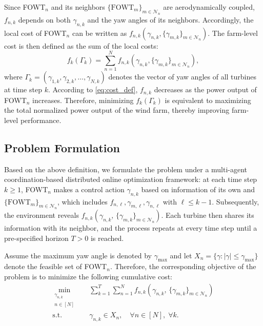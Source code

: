 Since FOWT$_n$ and its neighbors $\{\text{FOWT}_m\}_{m \in \mathcal{N}_n}$ are aerodynamically coupled, $f_{n,k}$ depends on both $\gamma_{n,k}$ and the yaw angles of its neighbors. Accordingly, the local cost of FOWT$_n$ can be written as $f_{n,k}\!\left(\gamma_{n,k}, \{\gamma_{m,k}\}_{m \in \mathcal{N}_n}\right)$. The farm-level cost is then defined as the sum of the local costs:
\begin{equation} \label{eq:cost_sum}
    f_k(\Gamma_k) = \sum_{n=1}^N f_{n,k}\!\left(\gamma_{n,k}, \{\gamma_{m,k}\}_{m \in \mathcal{N}_n}\right),
\end{equation}
where $\Gamma_k = (\gamma_{1,k}, \gamma_{2,k}, \dots, \gamma_{N,k})$ denotes the vector of yaw angles of all turbines at time step $k$. According to \eqref{eq:cost_def}, $f_{n,k}$ decreases as the power output of FOWT$_n$ increases. Therefore, minimizing $f_k(\Gamma_k)$ is equivalent to maximizing the total normalized power output of the wind farm, thereby improving farm-level performance.

\subsection{Problem Formulation}
Based on the above definition, we formulate the problem under a multi-agent coordination-based distributed online optimization framework: at each time step $k \geq 1$, FOWT$_n$ makes a control action $\gamma_{n,k}$ based on information of its own and $\{\text{FOWT}_m\}_{m \in \mathcal{N}_n}$, which includes $f_{n,\ell}, \gamma_{m,\ell}, \gamma_{n,\ell}$ with $\ell\leq k-1$. Subsequently, the environment reveals $f_{n,k}\!\left(\gamma_{n,k},\,\{\gamma_{m,k}\}_{m\in\mathcal{N}_n}\right)$. Each turbine then shares its information with its neighbor, and the process repeats at every time step until a pre-specified horizon $T>0$ is reached.

Assume the maximum yaw angle is denoted by $\gamma_{\max}$ and let $X_n=\{\gamma : |\gamma| \le \gamma_{\max}\}$ denote the feasible set of FOWT$_n$. Therefore, the corresponding objective of the problem is to minimize the following cumulative cost:
\begin{equation} \label{eq:opti2}
\begin{aligned}
    \min_{\substack{\gamma_{n,k} \\ n\in[N]}} \quad
    & \sum_{k=1}^{T}\sum_{n=1}^{N} f_{n,k}\!\left(\gamma_{n,k},\,\{\gamma_{m,k}\}_{m\in\mathcal{N}_n}\right) \\
    \text{s.t.}\quad
    & \gamma_{n,k} \in X_n, \quad \forall n\in[N],\; \forall k.
\end{aligned}
\end{equation}